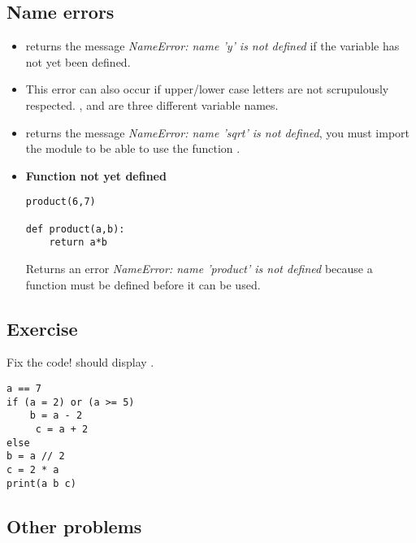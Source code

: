 \documentclass[11pt,class=report,crop=false]{standalone}
\begin{document}
\subsection{Name errors}

\begin{itemize}
  
  \item {} \quad \Python{} returns the message \emph{NameError: name 'y' is not defined} if the variable  has not yet been defined.
  
  \item This error can also occur if upper/lower case letters are not scrupulously respected. 
  ,  and  are three different variable names.
  
  \item {} \quad \Python{} returns the message \emph{NameError: name 'sqrt' is not defined}, you must import the module  to be able to use the function .
  
   \item \textbf{Function not yet defined}  
   
\begin{lstlisting}
product(6,7)

def product(a,b):
    return a*b
\end{lstlisting}   
  
Returns an error \emph{NameError: name 'product' is not defined} because a function must be defined before it can be used.
\end{itemize}


  
\subsection{Exercise}

Fix the code! \Python{} should display .

\begin{lstlisting}
a == 7
if (a = 2) or (a >= 5) 
    b = a - 2
     c = a + 2
else
b = a // 2
c = 2 * a
print(a b c)
\end{lstlisting}



\subsection{Other problems}
\end{document}

